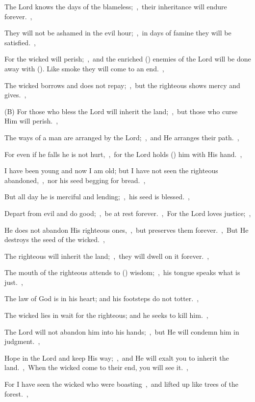 \documentclass[12pt,twoside,a5paper]{article}
\begin{document}
\begin{normalparskip}
  The Lord knows the days of the blameless;~\sep\ their inheritance will endure forever.~\sep

  They will not be ashamed in the evil hour;~\sep\ in days of famine they will be satisfied.~\sep

  For the wicked will perish;~\sep\ and the enriched () enemies of the Lord will be done away with (). Like smoke they will come to an end.~\sep

  The wicked borrows and does not repay;~\sep\ but the righteous shows mercy and gives.~\sep

  (B) For those who bless the Lord will inherit the land;~\sep\ but those who curse Him will perish.~\sep

  The ways of a man are arranged by the Lord;~\sep\ and He arranges their path.~\sep

  For even if he falls he is not hurt,~\sep\ for the Lord holds () him with His hand.~\sep

  I have been young and now I am old; but I have not seen the righteous abandoned,~\sep\ nor his seed begging for bread.~\sep

  But all day he is merciful and lending;~\sep\ his seed is blessed.~\sep

  Depart from evil and do good;~\sep\ be at rest forever.~\sep\ For the Lord loves justice;~\sep

  He does not abandon His righteous ones,~\sep\ but preserves them forever.~\sep\ But He destroys the seed of the wicked.~\sep

  The righteous will inherit the land;~\sep\ they will dwell on it forever.~\sep

  The mouth of the righteous attends to () wisdom;~\sep\ his tongue speaks what is just.~\sep

  The law of God is in his heart; and his footsteps do not totter.~\sep

  The wicked lies in wait for the righteous; and he seeks to kill him.~\sep

  The Lord will not abandon him into his hands;~\sep\ but He will condemn him in judgment.~\sep

  Hope in the Lord and keep His way;~\sep\ and He will exalt you to inherit the land.~\sep\  When the wicked come to their end, you will see it.~\sep

  For I have seen the wicked who were boasting~\sep\ and lifted up like trees of the forest.~\sep


\end{normalparskip}
\end{document}
